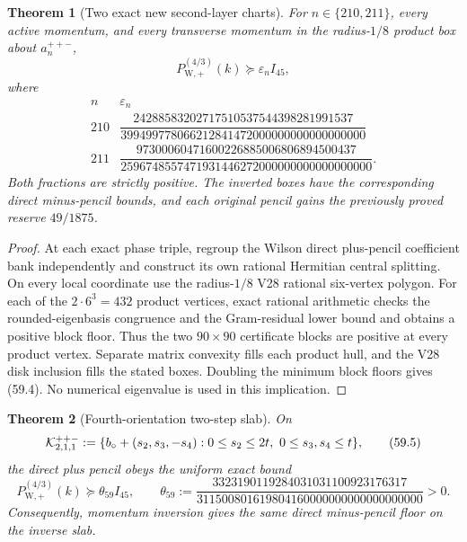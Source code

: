 \documentclass[11pt,oneside]{article}
\newtheorem{theorem}{Theorem}[section]
\theoremstyle{definition}
\theoremstyle{remark}
\begin{document}
\begin{theorem}[Two exact new second-layer charts]
\label{thm:newv59-two-charts}
For \(n\in\{210,211\}\), every active momentum, and every transverse
momentum in the radius-\(1/8\) product box about
\(a_n^{++-}\),
\[
 P_{\mathrm W,+}^{(4/3)}(k)\succeq\varepsilon_n I_{45}, \tag{59.3}
\]
where
\[
\begin{array}{c|c}
n&\varepsilon_n\\ \hline
210&
\dfrac{24288583202717510537544398281991537}
{399499778066212841472000000000000000000}\\[6pt]
211&
\dfrac{97300060471600226885006806894500437}
{2596748557471931446272000000000000000000}.
\end{array}                                           \tag{59.4}
\]
Both fractions are strictly positive.  The inverted boxes have
the corresponding direct minus-pencil bounds, and each original
pencil gains the previously proved reserve \(49/1875\).
\end{theorem}

\begin{proof}
At each exact phase triple, regroup the Wilson direct plus-pencil
coefficient bank independently and construct its own rational
Hermitian central splitting.  On every local coordinate use the
radius-\(1/8\) V28 rational six-vertex polygon.  For each of the
\(2\cdot6^3=432\) product vertices, exact rational arithmetic
checks the rounded-eigenbasis congruence and the Gram-residual
lower bound and obtains a positive block floor.  Thus the two
\(90\times90\) certificate blocks are positive at every product
vertex.  Separate matrix convexity fills each product hull, and
the V28 disk inclusion fills the stated boxes.  Doubling the
minimum block floors gives (59.4).  No numerical eigenvalue is
used in this implication.
\end{proof}

\begin{theorem}[Fourth-orientation two-step slab]
\label{thm:newv59-two-step-slab}
On
\[
 {\cal K}^{++-}_{2,1,1}:=
 \{b_\circ+(s_2,s_3,-s_4):
       0\le s_2\le2t,\ 0\le s_3,s_4\le t\},           \tag{59.5}
\]
the direct plus pencil obeys the uniform exact bound
\[
 P_{\mathrm W,+}^{(4/3)}(k)
 \succeq\theta_{59}I_{45},\qquad
 \theta_{59}:=
 \frac{3323190119284031031100923176317}
 {311500801619804160000000000000000000}>0.            \tag{59.6}
\]
Consequently, momentum inversion gives the same direct
minus-pencil floor on the inverse slab.
\end{theorem}
\end{document}
